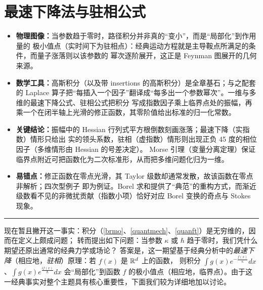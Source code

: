 \section{最速下降法与驻相公式}

\begin{keytakeaways}
\begin{itemize}
  \item \textbf{物理图像：}当参数趋于零时，路径积分并非真的“变小”，而是“局部化”到作用量的
        极小值点（实时间下为驻相点）：经典运动方程就是主导鞍点所满足的条件，而量子涨落则以该参数的
        幂次逐阶展开，这正是 Feynman 图展开的几何来源。
  \item \textbf{数学工具：}高斯积分（以及带 insertions 的高斯积分）是全章基石；与之配套的 Laplace
        算子把“每插入一个因子”翻译成“每多出一个参数幂次”。一维与多维的最速下降公式、驻相公式把积分
        写成指数因子乘上临界点处的振幅，再乘一个在闭半轴上光滑的修正函数，其零阶值给出标准的归一化常数。
  \item \textbf{关键结论：}振幅中的 Hessian 行列式平方根倒数刻画涨落；最速下降（实指数）情形只给出
        实的领头系数，驻相（虚指数）情形则出现正负 45 度的相位因子（多维情形由 Hessian 的号差决定）。
        Morse 引理（变量分离定理）保证临界点附近可把函数化为二次标准形，从而把多维问题化归为一维。
  \item \textbf{易错点：}修正函数在零点光滑，其 Taylor 级数却通常发散，故该函数在零点非解析；四次型例子
        即为例证。Borel 求和提供了“典范”的重构方式，而渐近级数看不见的非微扰贡献（指数小项）恰好对应
        Borel 变换的奇点与 Stokes 现象。
\end{itemize}
\end{keytakeaways}

\bigskip
\noindent\rule{\textwidth}{0.6pt}
\bigskip

现在暂且撇开这一事实：积分（\ref{brmo}、\ref{quantmech}、\ref{quanft}）是无穷维的，因而在定义上颇成问题；
转而提出如下问题：当参数 $\kappa$ 或 $\hbar$ 趋于零时，我们凭什么期望还原出通常的经典力学或场论？
答案是，这一期望基于经典分析中的\emph{最速下降}（相应地，\emph{驻相}）原理：若 $f(x)$ 是 $\Bbb R^d$ 上的函数，
则积分 $\int g(x)e^{-\frac{f(x)}{\kappa}}dx$、$\int g(x)e^{\frac{if(x)}{\hbar}}dx$ 会“局部化”到函数 $f$
的极小值点（相应地，临界点）。由于这一经典事实对整个主题具有核心重要性，下面我们较为详细地加以讨论。

